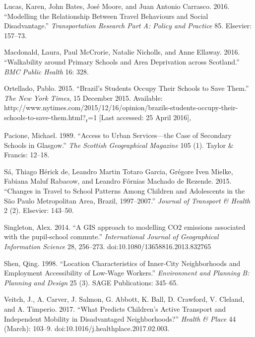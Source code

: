 \documentclass[3p,authoryear,preprint,review,12pt]{elsarticle}
\begin{document}
Lucas, Karen, John Bates, Jos{é} Moore, and Juan Antonio Carrasco. 2016.
``Modelling the Relationship Between Travel Behaviours and Social
Disadvantage.'' \emph{Transportation Research Part A: Policy and
Practice} 85. Elsevier: 157--73.

Macdonald, Laura, Paul McCrorie, Natalie Nicholls, and Anne Ellaway. 2016. ``Walkability around Primary Schools and Area Deprivation across Scotland.'' \emph{BMC Public Health} 16: 328.

Ortellado, Pablo. 2015. ``Brazil's Students Occupy Their Schools to Save
Them.'' \emph{The New York Times}, 15 December 2015. Available:
http://www.nytimes.com/2015/12/16/opinion/brazils-students-occupy-their-schools-to-save-them.html?\textsubscript{r}=1
{[}Last accessed: 25 April 2016{]},

Pacione, Michael. 1989. ``Access to Urban Services---the Case of
Secondary Schools in Glasgow.'' \emph{The Scottish Geographical
Magazine} 105 (1). Taylor \& Francis: 12--18.

S{á}, Thiago H{é}rick de, Leandro Martin Totaro Garcia, Gr{é}gore Iven
Mielke, Fabiana Maluf Rabacow, and Leandro F{ó}rnias Machado de Rezende.
2015. ``Changes in Travel to School Patterns Among Children and
Adolescents in the São Paulo Metropolitan Area, Brazil, 1997--2007.''
\emph{Journal of Transport \& Health} 2 (2). Elsevier: 143--50.

Singleton, Alex. 2014. ``A GIS approach to modelling CO2 emissions associated with the pupil-school commute.'' \emph{International Journal of Geographical Information Science} 28, 256–273. doi:10.1080/13658816.2013.832765

Shen, Qing. 1998. ``Location Characteristics of Inner-City Neighborhoods
and Employment Accessibility of Low-Wage Workers.'' \emph{Environment
and Planning B: Planning and Design} 25 (3). SAGE Publications: 345--65.

Veitch, J., A. Carver, J. Salmon, G. Abbott, K. Ball, D. Crawford, V. Cleland, and A. Timperio. 2017. ``What Predicts Children’s Active Transport and Independent Mobility in Disadvantaged Neighborhoods?'' \emph{Health \& Place} 44 (March): 103–9. doi:10.1016/j.healthplace.2017.02.003.
\end{document}
